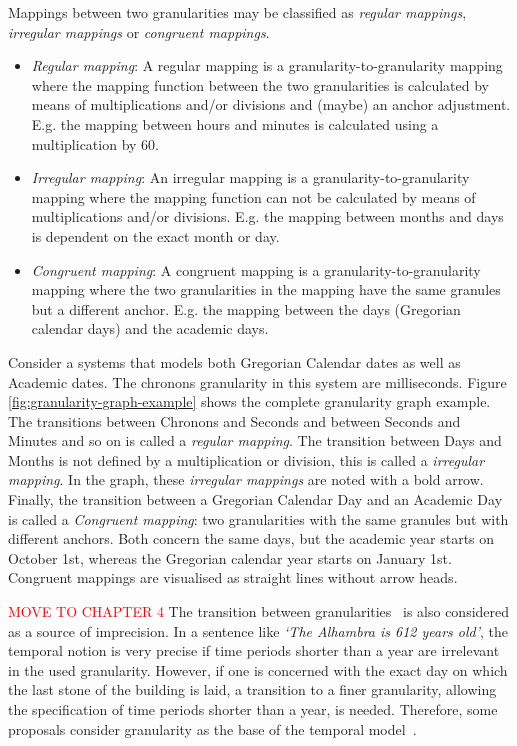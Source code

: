  Mappings between two granularities may be classified as \emph{regular mappings}, \emph{irregular mappings} or \emph{congruent mappings}.
\begin{itemize}
\item
\emph{Regular mapping}: A regular mapping is a granularity-to-granularity mapping where the mapping function between the two granularities is calculated by means of multiplications and/or divisions and (maybe) an anchor adjustment. E.g. the mapping between hours and minutes is calculated using a multiplication by $60$. 
\item
\emph{Irregular mapping}: An irregular mapping is a granularity-to-granularity mapping where the mapping function can not be calculated by means of multiplications and/or divisions. E.g. the mapping between months and days is dependent on the exact month or day. 
\item
\emph{Congruent mapping}: A congruent mapping is a granularity-to-granularity mapping where the two granularities in the mapping have the same granules but a different anchor. E.g. the mapping between the days (Gregorian calendar days) and the academic days. 
\end{itemize}

\begin{example}
Consider a systems that models both Gregorian Calendar dates as well as Academic dates. The chronons granularity in this system are milliseconds. Figure \ref{fig:granularity-graph-example} shows the complete granularity graph example. The transitions between Chronons and Seconds and between Seconds and Minutes and so on is called a \emph{regular mapping}. The transition between Days and Months is not defined by a multiplication or division, this is called a \emph{irregular mapping}. In the graph, these \emph{irregular mappings} are noted with a bold arrow. Finally, the transition between a Gregorian Calendar Day and an Academic Day is called a \emph{Congruent mapping}: two granularities with the same granules but with different anchors. Both concern the same days, but the academic year starts on October 1st, whereas the Gregorian calendar year starts on January 1st. Congruent mappings are visualised as straight lines without arrow heads.

\end{example}



\textcolor{red}{MOVE TO CHAPTER 4}
The transition between granularities~\cite{Lin97} is also considered as a source of imprecision. In a sentence like \emph{`The Alhambra is 612 years old'}, the temporal notion is very precise if time periods shorter than a year are irrelevant in the used granularity. However, if one is concerned with the exact day on which the last stone of the building is laid, a transition to a finer granularity, allowing the specification of time periods shorter than a year, is needed. Therefore, some proposals consider granularity as the base of the temporal model~\cite{Cru97}.

